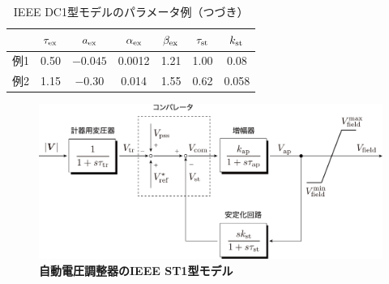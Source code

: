 \documentclass[tombow,dvipdfmx]{corona-a5-1.1}
\begin{document}
\begin{table}[h]
\medskip
 \caption{IEEE DC1型モデルのパラメータ例（つづき）}
 \label{table:AVRpara2}
 \centering
  \begin{tabular}{|c|c|c|c|c|c|c|}
   \hline
&    $\tau_{\rm ex}$ & $a_{\rm ex}$ & $\alpha_{\rm ex}$ & $\beta_{\rm ex}$ & $\tau_{\rm st}$ & $k_{\rm st}$\\
   \hline \hline
  例1 \cite[Table D.3. Unit F2]{anderson2008power}& 0.50 & $-0.045$ & 0.0012 & 1.21 & 1.00 & 0.08\\
   \hline
  例2 \cite[8.6.3節]{kundur1994power}& 1.15 & $-0.30$ & 0.014 & 1.55 & 0.62 & 0.058 \\
   \hline 
  \end{tabular}
\end{table}


%

\begin{figure}[t]
\centering
\includegraphics[width = .75\linewidth]{figs/avrst1}
\medskip
\caption{\textbf{自動電圧調整器のIEEE ST1型モデル}}
\label{fig:avrst1}
\medskip
\end{figure}
\end{document}
